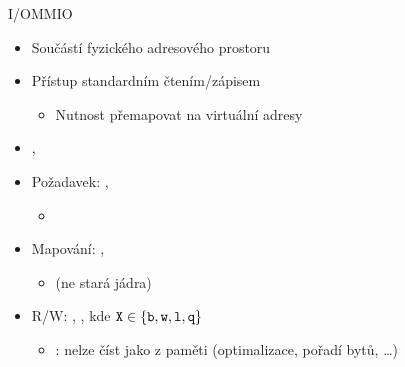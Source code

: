 \begin{frame}{I/O}{MMIO}

  \begin{itemize}
    \item Součástí fyzického adresového prostoru
    \item Přístup standardním čtením/zápisem
    \begin{itemize}
      \item Nutnost přemapovat na virtuální adresy
    \end{itemize}
  \end{itemize}

  \pause

  \begin{itemize}
    \item {}, 

    \item Požadavek: , 
    \begin{itemize}
      \item {}
    \end{itemize}

    \pause

    \item Mapování: , 
    \begin{itemize}
      \item {} (ne stará jádra)
    \end{itemize}

    \pause

    \item R/W: , , kde
      $\text{\code{X}}\in\left\{\text{\code{b}},\text{\code{w}},\text{\code{l}},\text{\code{q}}\right\}$
    \begin{itemize}
      \item \pozor: nelze číst jako z paměti (optimalizace, pořadí bytů, \dots)
    \end{itemize}
  \end{itemize}

\end{frame}

